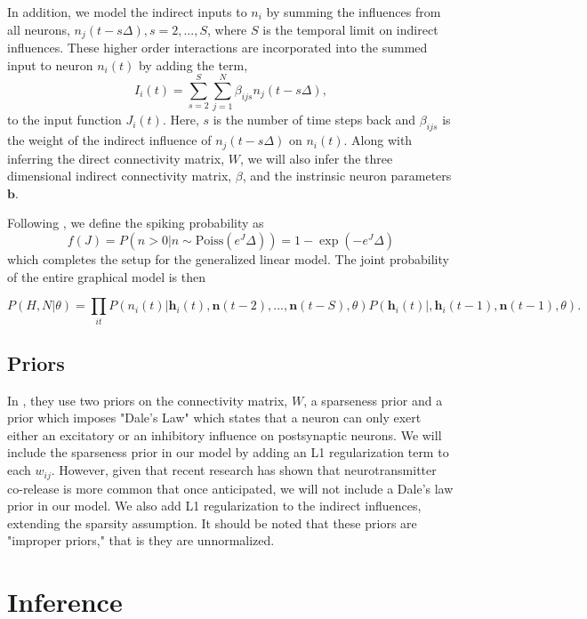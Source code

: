 \documentclass{article}
\begin{document}
In addition, we model the indirect inputs to $n_i$ by summing the
influences from all neurons, $n_j(t-s\Delta), s=2,...,S$, where $S$
is the temporal limit on indirect influences. These higher order
interactions are incorporated into the summed input to neuron
$n_i(t)$ by adding the term,
\begin{equation}
\label{new_term}
I_i(t)=\displaystyle\sum\limits_{s=2}^S\sum\limits_{j=1}^N \beta_{ijs}n_j(t-s\Delta),
\end{equation}
to the input function $J_i(t)$. Here, $s$ is the number of time
steps back and $\beta_{ijs}$ is the weight of the indirect influence
of $n_j(t-s\Delta)$ on $n_i(t)$. Along with inferring the direct connectivity matrix, $W$, we will
also infer the three dimensional indirect connectivity matrix, $\beta$, and the instrinsic neuron parameters $\mathbf{b}$.

Following \citep{mishchencko2011}, we define the spiking probability as 
\begin{equation} \label{f}
f(J) = P\left(n>0 | n \sim \text{Poiss}(e^J\Delta)\right) = 1 - \exp(-e^J\Delta)
\end{equation}
which completes the setup for the generalized linear model. The joint probability of the entire graphical model is then

\begin{equation} \label{f}
P(H,N|\theta) = \prod_{it}P(n_i(t)|\mathbf{h}_i(t),\mathbf{n}(t-2),...,\mathbf{n}(t-S),\theta)P(\mathbf{h}_i(t)|,\mathbf{h}_i(t-1),\mathbf{n}(t-1),\theta).
\end{equation}

\subsection{Priors}
In \citep{mishchencko2011}, they use two priors on the connectivity
matrix, $W$, a sparseness prior and a prior which imposes "Dale's
Law" which states that a neuron can only exert either an excitatory
or an inhibitory influence on postsynaptic neurons. We will include
the sparseness prior in our model by adding an L1 regularization
term to each $w_{ij}$. However, given that recent research has shown
that neurotransmitter co-release is more common that once anticipated,
we will not include a Dale's law prior in our model.
We also add L1 regularization to the indirect influences, extending
the sparsity assumption. It should be noted that these priors are "improper priors," that is they are unnormalized.

\section{Inference}
\end{document}
